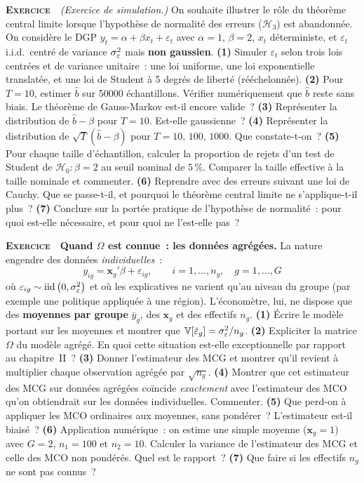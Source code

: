 \documentclass[10pt,a4paper,notitlepage]{article}
\newcounter{xnumber}
\newcommand{\exercice}{\refstepcounter{xnumber}\textsc{\textbf{Exercice}} \textbf{\thexnumber}\,\,}
\newcommand{\question}[1]{\textbf{(#1)}}
\begin{document}
\exercice\label{ex:tcl} \emph{(Exercice de simulation.)} On souhaite illustrer le rôle du
théorème central limite lorsque l'hypothèse de normalité des erreurs
($\mathcal H_3$) est abandonnée. On considère le DGP
$y_t = \alpha + \beta x_t + \varepsilon_t$ avec $\alpha=1$, $\beta=2$, $x_t$
déterministe, et $\varepsilon_t$ i.i.d.\ centré de variance $\sigma_{\varepsilon}^2$ mais
\textbf{non gaussien}. \question{1} Simuler $\varepsilon_t$ selon trois lois
centrées et de variance unitaire~: une loi uniforme, une loi exponentielle
translatée, et une loi de Student à 5 degrés de liberté (rééchelonnée).
\question{2} Pour $T=10$, estimer $\hat b$ sur 50000 échantillons. Vérifier
numériquement que $\hat b$ reste sans biais. Le théorème de Gauss-Markov
est-il encore valide~? \question{3} Représenter la distribution de
$\hat b - \beta$ pour $T=10$. Est-elle gaussienne~? \question{4} Représenter la
distribution de $\sqrt{T}\left(\hat b-\beta\right)$ pour
$T=10,\,100,\,1000$. Que constate-t-on~? \question{5} Pour chaque taille
d'échantillon, calculer la proportion de rejets d'un test de Student de
$\mathcal H_0:\beta=2$ au seuil nominal de $5\,\%$. Comparer la taille effective
à la taille nominale et commenter. \question{6} Reprendre avec des erreurs
suivant une loi de Cauchy. Que se passe-t-il, et pourquoi le théorème central
limite ne s'applique-t-il plus~? \question{7} Conclure sur la portée pratique de
l'hypothèse de normalité~: pour quoi est-elle nécessaire, et pour quoi ne
l'est-elle pas~?\newline

\bigskip
\exercice\label{ex:donnees-groupees} \textbf{Quand $\Omega$ est connue~: les
données agrégées.} La nature engendre des données \emph{individuelles}~:
\[
  y_{ig} = \mathbf x_g'\beta + \varepsilon_{ig},
  \qquad i=1,\dots,n_g,\quad g=1,\dots,G
\]
où $\varepsilon_{ig}\sim\mathrm{iid}\left(0,\sigma_{\varepsilon}^2\right)$ et où les explicatives ne varient
qu'au niveau du groupe (par exemple une politique appliquée à une région).
L'économètre, lui, ne dispose que des \textbf{moyennes par groupe}
$\bar y_g$, des $\mathbf x_g$ et des effectifs $n_g$. \question{1} Écrire le
modèle portant sur les moyennes et montrer que
$\mathbb V[\bar\varepsilon_g] = \sigma_{\varepsilon}^2/n_g$. \question{2} Expliciter la matrice
$\Omega$ du modèle agrégé. En quoi cette situation est-elle exceptionnelle par
rapport au chapitre~II~? \question{3} Donner l'estimateur des MCG et montrer
qu'il revient à multiplier chaque observation agrégée par $\sqrt{n_g}$.
\question{4} Montrer que cet estimateur des MCG sur données agrégées coïncide
\emph{exactement} avec l'estimateur des MCO qu'on obtiendrait sur les données
individuelles. Commenter. \question{5} Que perd-on à appliquer les MCO ordinaires
aux moyennes, sans pondérer~? L'estimateur est-il biaisé~? \question{6}
Application numérique~: on estime une simple moyenne ($\mathbf x_g = 1$) avec
$G=2$, $n_1 = 100$ et $n_2 = 10$. Calculer la variance de l'estimateur des MCG
et celle des MCO non pondérés. Quel est le rapport~? \question{7} Que faire si
les effectifs $n_g$ ne sont pas connus~?\newline
\end{document}
